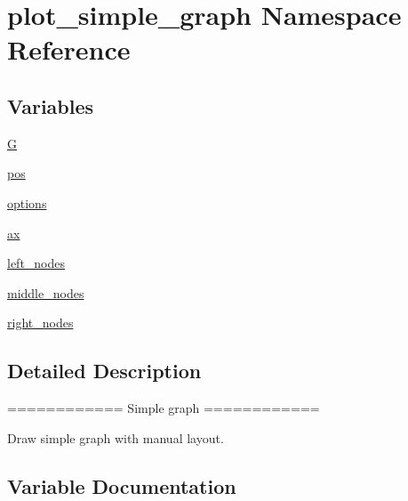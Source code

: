 \hypertarget{namespaceplot__simple__graph}{}\section{plot\+\_\+simple\+\_\+graph Namespace Reference}
\label{namespaceplot__simple__graph}
\subsection*{Variables}
\begin{DoxyCompactItemize}
\item 
\hyperlink{namespaceplot__simple__graph_a8db47381dbf8e8a741f691313e0b3dc0}{G}
\item 
\hyperlink{namespaceplot__simple__graph_aa7911b916f997d25df117ae95ae2dcb1}{pos}
\item 
\hyperlink{namespaceplot__simple__graph_a422769fa61f5cbc4c5d2986b28eed690}{options}
\item 
\hyperlink{namespaceplot__simple__graph_abbc22c59a01d817df74c59a9cb90fac1}{ax}
\item 
\hyperlink{namespaceplot__simple__graph_a9707cf70a67a89a47e701f015be39092}{left\+\_\+nodes}
\item 
\hyperlink{namespaceplot__simple__graph_a46ef967c13023c4b17fb777131162dca}{middle\+\_\+nodes}
\item 
\hyperlink{namespaceplot__simple__graph_a45abc8554bc4eb5c3abb1a0b4624c16d}{right\+\_\+nodes}
\end{DoxyCompactItemize}


\subsection{Detailed Description}
\begin{DoxyVerb}============
Simple graph
============

Draw simple graph with manual layout.
\end{DoxyVerb}
 

\subsection{Variable Documentation}
\mbox{\label{namespaceplot__simple__graph_abbc22c59a01d817df74c59a9cb90fac1}} 
